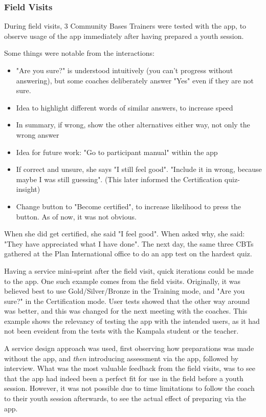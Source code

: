   \subsubsection{Field Visits}

  During field visits, 3 Community Bases Trainers were tested with the app, to observe usage of the app immediately after having prepared a youth session.

  Some things were notable from the interactions: %
  \begin{itemize}
    \item "Are you sure?" is understood intuitively (you can't progress without answering), but some coaches deliberately answer "Yes" even if they are not sure.
    \item Idea to highlight different words of similar answers, to increase speed
    \item In summary, if wrong, show the other alternatives either way, not only the wrong answer
    \item Idea for future work: "Go to participant manual" within the app %
    \item If correct and unsure, she says "I still feel good". "Include it in wrong, because maybe I was still guessing". (This later informed the Certification quiz-insight)
    \item Change button to "Become certified", to increase likelihood to press the button. As of now, it was not obvious.
  \end{itemize}

  When she did get certified, she said "I feel good". When asked why, she said: "They have appreciated what I have done". The next day, the same three CBTs gathered at the Plan International office to do an app test on the hardest quiz.

  Having a service mini-sprint after the field visit, quick iterations could be made to the app. One such example comes from the field visits. Originally, it was believed best to use Gold/Silver/Bronze in the Training mode, and "Are you sure?" in the Certification mode. User tests showed that the other way around was better, and this was changed for the next meeting with the coaches. This example shows the relevancy of testing the app with the intended users, as it had not been eveident from the tests with the Kampala student or the teacher.

  A service design approach was used, first observing how preparations was made without the app, and \textit{then} introducing assessment via the app, followed by interview. What was the most valuable feedback from the field visits, was to see that the app had indeed been a perfect fit for use in the field before a youth session. However, it was not possible due to time limitations to follow the coach to their youth session afterwards, to see the actual effect of preparing via the app.

